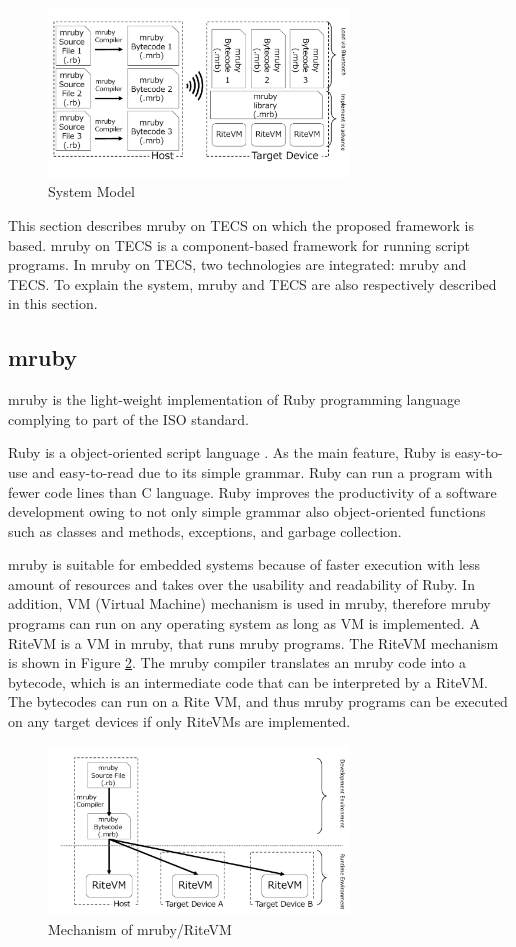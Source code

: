 \documentclass[conference,compsoc]{IEEEtran}
\begin{document}
\begin{figure}[t]
    \centering
    \includegraphics[width=8cm,clip]{figure/proposed.pdf}
    \caption{System Model}
    \label{fig:proposed}
\end{figure}

This section describes mruby on TECS on which the proposed framework is based.
mruby on TECS is a component-based framework for running script programs.
In mruby on TECS, two technologies are integrated: mruby and TECS.
To explain the system, mruby and TECS are also respectively described in this section.

\subsection{mruby}
\label{sec:mruby}
mruby is the light-weight implementation of Ruby programming language complying to part of the ISO standard.

Ruby is a object-oriented script language \cite{url:Ruby}.
As the main feature, Ruby is easy-to-use and easy-to-read due to its simple grammar.
Ruby can run a program with fewer code lines than C language.
Ruby improves the productivity of a software development owing to not only simple grammar also object-oriented functions such as classes and methods, exceptions, and garbage collection.

mruby is suitable for embedded systems because of faster execution with less amount of resources and takes over the usability and readability of Ruby.
In addition, VM (Virtual Machine) mechanism is used in mruby, therefore mruby programs can run on any operating system as long as VM is implemented.
A RiteVM is a VM in mruby, that runs mruby programs.
The RiteVM mechanism is shown in Figure \ref{fig:mruby}.
The mruby compiler translates an mruby code into a bytecode, which is an intermediate code that can be interpreted by a RiteVM.
The bytecodes can run on a Rite VM, and thus mruby programs can be executed on any target devices if only RiteVMs are implemented.
\begin{figure}[t]
    \centering
    \includegraphics[width=8cm,clip]{figure/mruby.pdf}
    \caption{Mechanism of mruby/RiteVM}
    \label{fig:mruby}
\end{figure}
\end{document}

